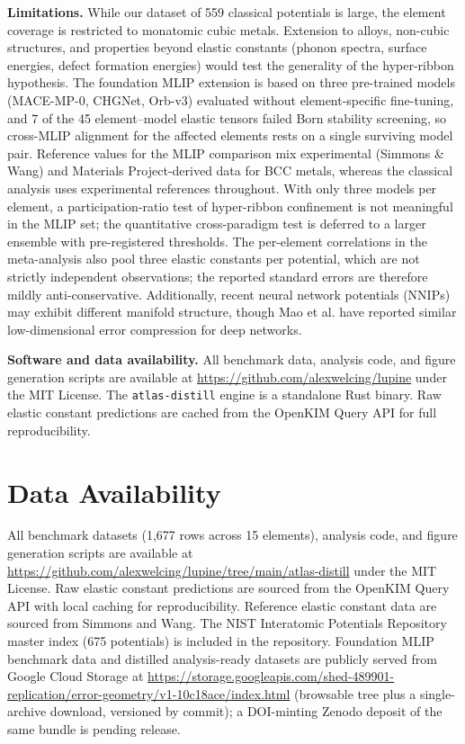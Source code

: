 \documentclass[twocolumn,9pt]{extarticle}
\begin{document}
\textbf{Limitations.} While our dataset of 559 classical potentials is large, the element coverage is restricted to monatomic cubic metals. Extension to alloys, non-cubic structures, and properties beyond elastic constants (phonon spectra, surface energies, defect formation energies) would test the generality of the hyper-ribbon hypothesis. The foundation MLIP extension is based on three pre-trained models (MACE-MP-0, CHGNet, Orb-v3) evaluated without element-specific fine-tuning, and 7 of the 45 element--model elastic tensors failed Born stability screening, so cross-MLIP alignment for the affected elements rests on a single surviving model pair. Reference values for the MLIP comparison mix experimental (Simmons \& Wang) and Materials Project-derived data for BCC metals, whereas the classical analysis uses experimental references throughout. With only three models per element, a participation-ratio test of hyper-ribbon confinement is not meaningful in the MLIP set; the quantitative cross-paradigm test is deferred to a larger ensemble with pre-registered thresholds\cite{welcing2026universality}. The per-element correlations in the meta-analysis also pool three elastic constants per potential, which are not strictly independent observations; the reported standard errors are therefore mildly anti-conservative. Additionally, recent neural network potentials (NNIPs) may exhibit different manifold structure, though Mao et al.\cite{mao2024,mao2026} have reported similar low-dimensional error compression for deep networks.

\textbf{Software and data availability.} All benchmark data, analysis code, and figure generation scripts are available at \url{https://github.com/alexwelcing/lupine} under the MIT License. The \texttt{atlas-distill} engine is a standalone Rust binary. Raw elastic constant predictions are cached from the OpenKIM Query API for full reproducibility.

\section*{Data Availability}

All benchmark datasets (1,677 rows across 15 elements), analysis code, and figure generation scripts are available at \url{https://github.com/alexwelcing/lupine/tree/main/atlas-distill} under the MIT License. Raw elastic constant predictions are sourced from the OpenKIM Query API\cite{openkim} with local caching for reproducibility. Reference elastic constant data are sourced from Simmons and Wang\cite{simmons1971}. The NIST Interatomic Potentials Repository master index (675 potentials) is included in the repository. Foundation MLIP benchmark data and distilled analysis-ready datasets are publicly served from Google Cloud Storage at \url{https://storage.googleapis.com/shed-489901-replication/error-geometry/v1-10c18ace/index.html} (browsable tree plus a single-archive download, versioned by commit); a DOI-minting Zenodo deposit of the same bundle is pending release.
\end{document}
